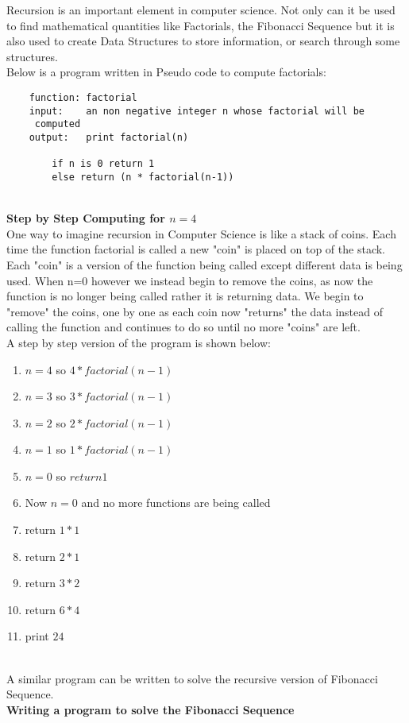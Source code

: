 \documentclass{article}
\begin{document}
Recursion is an important element in computer science. Not only can it be used to find mathematical quantities like Factorials, the Fibonacci Sequence but it is also used to create Data Structures to store information, or search through some structures. 
\\Below is a program written in Pseudo code to compute factorials:
\begin{lstlisting}
	function: factorial
	input:    an non negative integer n whose factorial will be
	 computed
	output:   print factorial(n)
	
		if n is 0 return 1
		else return (n * factorial(n-1))
\end{lstlisting}
~\\
{\bf Step by Step Computing for $n=4$}
\\
One way to imagine recursion in Computer Science is like a stack of coins. Each time the function factorial is called a new "coin" is placed on top of the stack. Each "coin" is a version of the function being called except different data is being used.  When n=0 however we instead begin to remove the coins, as now the function is no longer being called rather it is returning data. We begin to "remove" the coins, one by one as each coin now "returns" the data instead of calling the function and continues to do so until no more "coins" are left.
\\
A step by step version of the program is shown below:
\begin{enumerate}
	\item $n=4$ so $4* factorial(n-1)$
	\item $n=3$ so $3* factorial(n-1)$
	\item $n=2$ so $2* factorial(n-1)$
	\item $n=1$ so $1* factorial(n-1)$
	\item $n=0$ so $return 1$
	\item Now $n=0$ and no more functions are being called 
	\item return $1*1$
	\item return $2*1$
	\item return $3*2$
	\item return $6*4$
	\item print $24$
\end{enumerate}
~\\A similar program can be written to solve the recursive version of Fibonacci Sequence.  
\\
{\bf Writing a program to solve the Fibonacci Sequence}
\\
\end{document}
